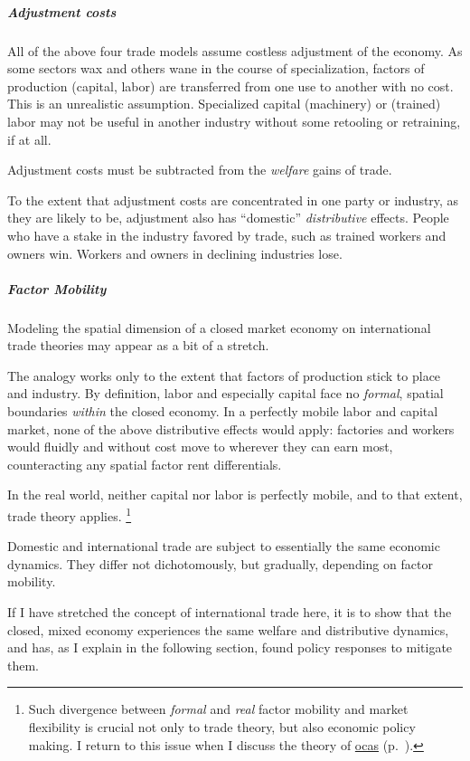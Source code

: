 \subparagraph{Adjustment costs}
	\label{sec:adjustment-costs}
All of the above four trade models assume costless adjustment of the economy.
As some sectors wax and others wane in the course of specialization, factors of production (capital, labor) are transferred from one use to another with no cost.
This is an unrealistic assumption.
Specialized capital (machinery) or (trained) labor may not be useful in another industry without some retooling or retraining, if at all.

Adjustment costs must be subtracted from the \emph{welfare} gains of trade.

To the extent that adjustment costs are concentrated in one party or industry, as they are likely to be, adjustment also has ``domestic'' \emph{distributive} effects.
People who have a stake in the industry favored by trade, such as trained workers and owners win.
Workers and owners in declining industries lose.

\subparagraph{Factor Mobility}
	\label{sec:factor-mobility-trade}
Modeling the spatial dimension of a closed market economy on international trade theories may appear as a bit of a stretch.

The analogy works only to the extent that factors of production stick to place and industry.
By definition, labor and especially capital face no \emph{formal}, spatial boundaries \emph{within} the closed economy.
In a perfectly mobile labor and capital market, none of the above distributive effects would apply:
factories and workers would fluidly and without cost move to wherever they can earn most, counteracting any spatial factor rent differentials.

In the real world, neither capital nor labor is perfectly mobile, and to that extent, trade theory applies.
\footnote{
	Such divergence between \emph{formal} and \emph{real} factor mobility and market flexibility is crucial not only to trade theory, but also economic policy making.
	I return to this issue when I discuss the theory of \hyperref[sec:OCA]{\glspl{oca}} (p.~\pageref{sec:OCA}).
}

Domestic and international trade are subject to essentially the same economic dynamics.
They differ not dichotomously, but gradually, depending on factor mobility.

If I have stretched the concept of international trade here, it is to show that the closed, mixed economy experiences the same welfare and distributive dynamics, and has, as I explain in the following section, found policy responses to mitigate them.

